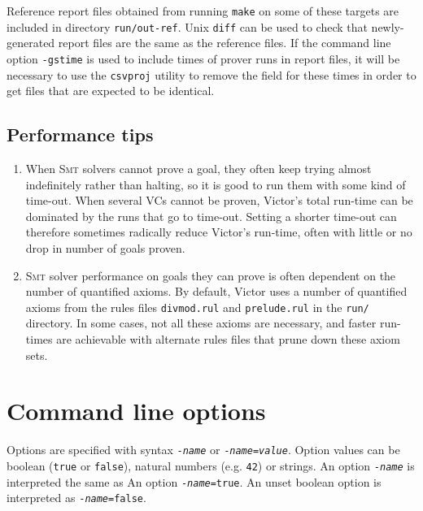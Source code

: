 \documentclass[12pt,fleqn]{article}
\newcommand{\smt}{\textsc{Smt}}
\begin{document}
Reference report files obtained from running \texttt{make} on some of
these targets are included in directory \texttt{run/out-ref}.
%
Unix \texttt{diff} can be used to check that newly-generated
report files are the same as the reference files.
%
If the command line option \texttt{-gstime} is used to include times
of prover runs in report files, it will be necessary to use
the \texttt{csvproj} utility to remove the field for these times
in order to get files that are expected to be identical.

\subsection{Performance tips}

\begin{enumerate}

\item When \smt{} solvers cannot prove a goal, they often keep trying
  almost indefinitely rather than halting, so it is good to run them
  with some kind of time-out.  
  When several VCs cannot be proven, Victor's total run-time can be
  dominated by the runs that go to time-out.  Setting a shorter
  time-out can therefore sometimes radically reduce Victor's run-time,
  often with little or no drop in number of goals proven.

\item \smt{} solver performance on goals they can prove is often
  dependent on the number of quantified axioms. 
  By default, Victor uses a number of quantified axioms from the 
  rules files \texttt{divmod.rul} and \texttt{prelude.rul} in the \texttt{run/}
  directory. 
  In some cases, not all these axioms are necessary, and faster
  run-times are achievable with alternate rules files that prune down
  these axiom sets.

\end{enumerate}


\section{Command line options}
Options are specified with syntax 
\texttt{-\emph{name}} or
\texttt{-\emph{name}=\emph{value}}.
%
Option values can be boolean (\texttt{true} or \texttt{false}),
natural numbers (e.g. \texttt{42}) or strings.
%
An option \texttt{-\emph{name}} is interpreted the same as 
An option \texttt{-\emph{name}=true}.  An unset boolean option is interpreted
as \texttt{-\emph{name}=false}.
\end{document}
